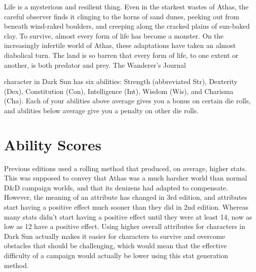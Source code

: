 {Life is a mysterious and resilient thing. Even in the starkest wastes of Athas, the careful observer finds it clinging to the horns of sand dunes, peeking out from beneath wind-raked boulders, and creeping along the cracked plains of sun-baked clay.
To survive, almost every form of life has become a monster. On the increasingly infertile world of Athas, these adaptations have taken an almost diabolical turn. The land is so barren that every form of life, to one extent or another, is both predator and prey.}
{The Wanderer's Journal}

 character in {\tableheader Dark Sun} has six abilities: Strength (abbreviated Str), Dexterity (Dex), Constitution (Con), Intelligence (Int), Wisdom (Wis), and Charisma (Cha). Each of your abilities above average gives you a bonus on certain die rolls, and abilities below average give you a penalty on other die rolls.

\section{Ability Scores}

Previous editions used a rolling method that produced, on average, higher stats. This was supposed to convey that Athas was a much harsher world than normal D\&D campaign worlds, and that its denizens had adapted to compensate. However, the meaning of an attribute has changed in 3rd edition, and attributes start having a positive effect much sooner than they did in 2nd edition. Whereas many stats didn't start having a positive effect until they were at least 14, now as low as 12 have a positive effect. Using higher overall attributes for characters in {\tableheader Dark Sun} actually makes it easier for characters to survive and overcome obstacles that should be challenging, which would mean that the effective difficulty of a campaign would actually be lower using this stat generation method.




